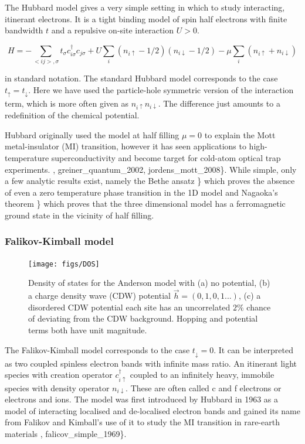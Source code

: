 The Hubbard model gives a very simple setting in which to study interacting, itinerant electrons. It is a tight binding model of spin half electrons with finite bandwidth \(t\) and a repulsive on-site interaction \(U > 0\).

\[
    H = -\sum_{<ij>,\sigma} t_{\sigma} c^\dagger_{i\sigma}c_{j\sigma} + U \sum_{i} (n_{i \uparrow} - 1/2)( n_{i\downarrow} - 1/2) - \mu \sum_i \left( n_{i \uparrow} + n_{i \downarrow} \right)
\]

in standard notation. The standard Hubbard model corresponds to the case \(t_{\uparrow} = t_{\downarrow}\). Here we have used the particle-hole symmetric version of the interaction term, which is more often given as \(n_{i \uparrow} n_{i\downarrow}\). The difference just amounts to a redefinition of the chemical potential.

Hubbard originally used the model at half filling \(\mu = 0\) to explain the Mott metal-insulator (MI) transition, however it has seen applications to high-temperature superconductivity and become target for cold-atom optical trap experiments. \textcite{HubbardModelHalf2013}, greiner\_quantum\_2002, jordens\_mott\_2008\}. While simple, only a few analytic results exist, namely the Bethe ansatz \textcite{liebAbsenceMottTransition1968}\} which proves the absence of even a zero temperature phase transition in the 1D model and Nagaoka's theorem \textcite{nagaokaFerromagnetismNarrowAlmost1966}\} which proves that the three dimensional model has a ferromagnetic ground state in the vicinity of half filling.

\hypertarget{falikov-kimball-model}{%
\subsubsection{Falikov-Kimball model}\label{falikov-kimball-model}}

\begin{figure}
  \centering
    \texttt{[image: figs/DOS]}
  \caption{Density of states for the Anderson model with (a) no potential, (b) a charge density wave (CDW) potential $\vec{h} = (0,1,0,1...)$, (c) a disordered CDW potential each site has an uncorrelated $2\%$ chance of deviating from the CDW background. Hopping and potential terms both have unit magnitude.}
  \label{fig:fk_dos}
\end{figure}

The Falikov-Kimball model corresponds to the case \(t_{\downarrow} = 0\). It can be interpreted as two coupled spinless electron bands with infinite mass ratio. An itinerant light species with creation operator \(c^\dagger_{i\uparrow}\) coupled to an infinitely heavy, immobile species with density operator \(n_{i\downarrow}\). These are often called c and f electrons or electrons and ions. The model was first introduced by Hubbard in 1963 as a model of interacting localised and de-localised electron bands and gained its name from Falikov and Kimball's use of it to study the MI transition in rare-earth materials \textcite{hubbardj.ElectronCorrelationsNarrow1963}, falicov\_simple\_1969\}.


